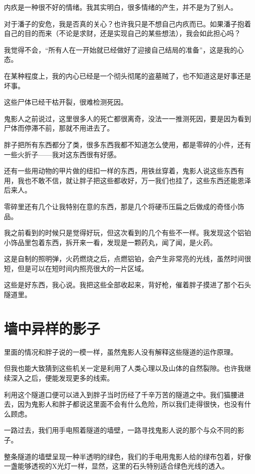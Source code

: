 内疚是一种很不好的情绪。我其实明白，很多情绪的产生，并不是为了别人。

对于潘子的安危，我是否真的关心？也许我只是不想自己内疚而已。如果潘子抱着自己的目的而来（不论是求财，还是实现自己的某些想法），我会如此担心吗？

我觉得不会，“所有人在一开始就已经做好了迎接自己结局的准备”，这是我的心态。

在某种程度上，我的内心已经是一个彻头彻尾的盗墓贼了，也不知道这是好事还是坏事。

这些尸体已经干枯开裂，很难检测死因。

鬼影人之前说过，这里很多人的死亡都很离奇，没法一一推测死因，要是因为看到尸体而停滞不前，那就不用进去了。

胖子把所有东西都分了类，很多东西我都不知道怎么使用，都是零碎的小件，还有一些火折子——我对这东西很有好感。

还有一些用动物的甲片做的纽扣一样的东西，用铁丝穿着，鬼影人说这些东西有用，我也不敢不信，就让胖子把这些都收好，万一我们也挂了，这些东西还能恩泽后来人。

零碎里还有几个让我特别在意的东西，那是几个将硬币压扁之后做成的奇怪小饰品。

我之前看到的时候只是觉得好玩，但这次看到的几个有些不一样。我发现这个铝铂小饰品里包着东西，拆开来一看，发现是一颗药丸，闻了闻，是火药。

这是自制的照明弹，火药燃烧之后，点燃铝铂，会产生非常亮的光线，虽然时间很短，但是可以在短时间内照亮很大的一片区域。

这些是好东西，我心说。我把这些全部收起来，背好枪，催着胖子摸进了那个石头隧道里。

\chapter{墙中异样的影子}

里面的情况和胖子说的一模一样，虽然鬼影人没有解释这些隧道的运作原理。

但我也能大致猜到这些机关一定是利用了人类心理以及山体的自然裂隙。也许我继续深入之后，便能发现更多的线索。

利用这个隧道口便可以进入到胖子当时历经了千辛万苦的隧道之中。我们猫腰进去，因为鬼影人和胖子都说这里面不会有什么危险，所以我们走得很快，也没有什么顾虑。

一路过去，我们用手电照着隧道的墙壁，一路寻找鬼影人说的那个与众不同的影子。

整条隧道的墙壁呈现一种半透明的绿色，我们的手电用鬼影人给的绿布包着，好像一盏能够透视的X光灯一样，显然，这里的石头特别适合绿色光线的透入。

